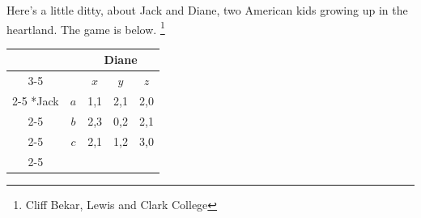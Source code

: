 \documentclass[addpoints ]{exam}
\begin{document}
\begin{questions}



  








\question%
Here's a little ditty, about Jack and Diane,
two American kids growing up in the heartland.
The game is below.
\footnote{Cliff Bekar, Lewis and Clark College}

  \begin{table}[h!]
    \centering
    \setlength{\extrarowheight}{2pt}
    \begin{tabular}{*{5}{c|}}
      \multicolumn{2}{c}{} & \multicolumn{3}{c}{Diane} \\\cline{3-5}
      \multicolumn{1}{c}{} &     & $x$ & $y$ & $z$ \\\cline{2-5}
      \multirow{3}*{Jack}  & $a$ & 1,1 & 2,1 & 2,0 \\\cline{2-5}
                           & $b$ & 2,3 & 0,2 & 2,1 \\\cline{2-5}
                           & $c$ & 2,1 & 1,2 & 3,0 \\\cline{2-5}
    \end{tabular}
  \end{table}


\end{questions}
\end{document}
